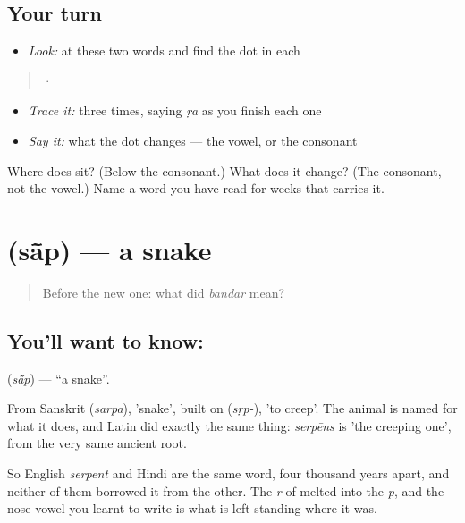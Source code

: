 \subsection*{Your turn}
\begin{itemize}
\raggedright
  \item \emph{Look:} at these two words and find the dot in each
\end{itemize}

\begin{quote}
  ·  
\end{quote}

\begin{itemize}
\raggedright
  \item \emph{Trace it:}  three times, saying \emph{ṛa} as you finish each one
  \item \emph{Say it:} what the dot changes — the vowel, or the consonant
\end{itemize}

\begin{tcolorbox}[breakable,colback=teal!4,colframe=teal!35!black,title={Before you move on}]
Where does \textbf{} sit? (Below the consonant.) What does it change? (The consonant, not the vowel.) Name a word you have read for weeks that carries it.
\end{tcolorbox}
\section[\texorpdfstring{\hi{साँप} (sā̃p)}{साँप (sā̃p)}]{ (sā̃p) — a snake}

\label{lesson:HI-C60-snake}



\begin{quote}
Before the new one: what did \emph{bandar} mean?
\end{quote}

\subsection*{You'll want to know: }
\textbf{} (\emph{sā̃p}) — \textquotedblleft{}a snake\textquotedblright{}.

From Sanskrit  (\emph{sarpa}), 'snake', built on  (\emph{sṛp-}), 'to creep'. The animal is named for what it does, and Latin did exactly the same thing: \emph{serpēns} is 'the creeping one', from the very same ancient root.

So English \emph{serpent} and Hindi  are the same word, four thousand years apart, and neither of them borrowed it from the other. The \emph{r} of  melted into the \emph{p}, and the nose-vowel you learnt to write is what is left standing where it was.

